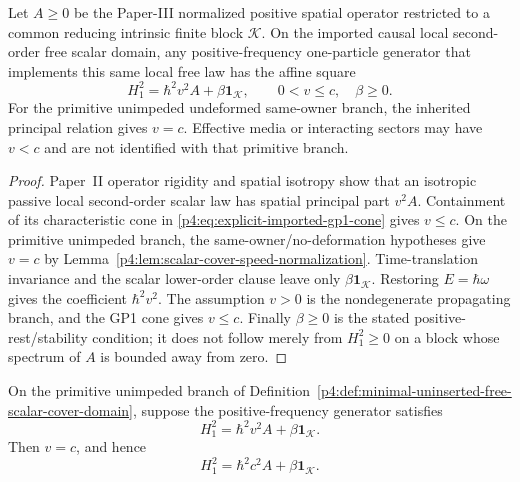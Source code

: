 \documentclass[12pt,a4paper]{article}
\begin{document}
\begin{lemma}
\label{p4:lem:second-order-free-collapse}
Let \(A\ge0\) be the Paper-III normalized positive spatial operator restricted
to a common reducing intrinsic finite block \(\mathcal K\).  On the imported
causal local second-order free scalar domain, any positive-frequency
one-particle generator that implements this same local free law has the
affine square
\begin{equation}
\label{p4:eq:affine-collapse-second-order-free-sector}
  H_1^2=\hbar^2v^2 A+\beta\mathbf 1_{\mathcal K},
  \qquad
  0<v\le c,
  \quad
  \beta\ge0.
\end{equation}
For the primitive unimpeded undeformed same-owner branch, the inherited
principal relation gives \(v=c\).  Effective media or interacting sectors may have \(v<c\)
and are not identified with that primitive branch.
\end{lemma}

\begin{proof}
Paper~II operator rigidity and spatial isotropy show that an isotropic
passive local second-order scalar law has spatial principal part \(v^2A\).
Containment of its characteristic cone in
\eqref{p4:eq:explicit-imported-gp1-cone} gives \(v\le c\).  On the primitive
unimpeded branch, the same-owner/no-deformation hypotheses give \(v=c\) by
Lemma~\ref{p4:lem:scalar-cover-speed-normalization}.  Time-translation
invariance and the scalar lower-order clause leave only
\(\beta\mathbf1_{\mathcal K}\).  Restoring \(E=\hbar\omega\) gives the
coefficient \(\hbar^2v^2\).  The assumption \(v>0\) is the nondegenerate
propagating branch, and the GP1 cone gives \(v\le c\).  Finally
\(\beta\ge0\) is the stated positive-rest/stability condition; it does not
follow merely from \(H_1^2\ge0\) on a block whose spectrum of \(A\) is bounded
away from zero.
\end{proof}

\begin{lemma}
\label{p4:lem:scalar-cover-speed-normalization}
On the primitive unimpeded branch of
Definition~\ref{p4:def:minimal-uninserted-free-scalar-cover-domain}, suppose
the positive-frequency generator satisfies
\[
H_1^2=\hbar^2v^2 A+\beta\mathbf 1_{\mathcal K}.
\]
Then \(v=c\), and hence
\[
H_1^2=\hbar^2c^2A+\beta\mathbf1_{\mathcal K}.
\]
\end{lemma}
\end{document}
